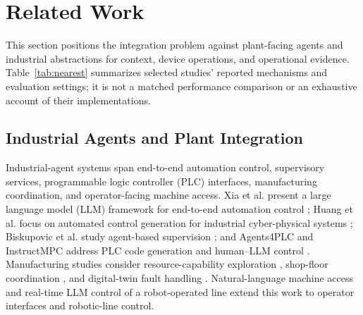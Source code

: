\section{Related Work}
\label{sec:related}
This section positions the integration problem against plant-facing agents
and industrial abstractions for context, device operations, and operational
evidence. Table~\ref{tab:nearest} summarizes selected studies' reported
mechanisms and evaluation settings; it is not a matched performance
comparison or an exhaustive account of their implementations.

\subsection{Industrial Agents and Plant Integration}
Industrial-agent systems span end-to-end automation control, supervisory
services, programmable logic controller (PLC) interfaces, manufacturing
coordination, and operator-facing machine access. Xia et al. present a large
language model (LLM) framework for end-to-end automation
control \cite{xia2025control}; Huang et al. focus on automated control
generation for industrial cyber-physical systems \cite{huang2026made};
Biskupovic et al. study agent-based supervision
\cite{biskupovic2025supervision}; and Agents4PLC and InstructMPC address PLC
code generation and human--LLM control
\cite{liu2026agents4plc,wu2025instructmpc}. Manufacturing studies consider
resource-capability exploration \cite{lim2025llmenabled}, shop-floor
coordination \cite{zhao2026shopfloor}, and digital-twin fault handling
\cite{gill2025llmdt}. Natural-language machine access \cite{hofmann2025nlc}
and real-time LLM control of a robot-operated line
\cite{waseem2026pretrained} extend this work to operator interfaces and
robotic-line control.

